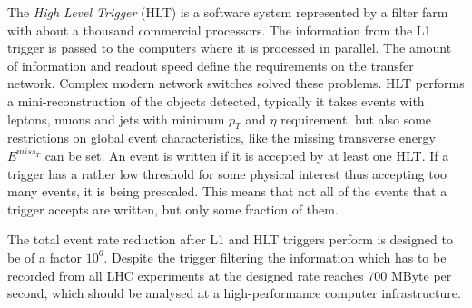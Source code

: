 The \textit{High Level Trigger} (HLT) is a software system represented by a filter farm with about a thousand commercial processors. The information
from the L1 trigger is passed to the computers where it is processed in parallel. The amount of information and readout speed define the requirements
on the transfer network. Complex modern network switches solved these problems. HLT performs a mini-reconstruction of the objects detected,
typically it takes events with leptons, muons and jets with minimum $p_{T}$ and $\eta$ requirement, but also some restrictions on global
event characteristics, like the missing transverse energy $E^{miss_{T}}$ can be set. An event is written if it is accepted by at least one HLT.
If a trigger has a rather low threshold for some physical interest thus accepting too many events, it is being prescaled. This means that not 
all of the events that a trigger accepts are written, but only some fraction of them.

The total event rate reduction after L1 and HLT triggers perform is designed to be of a factor $10^{6}$. Despite the trigger filtering
the information which has to be recorded from all LHC experiments at the designed rate reaches 700 MByte per second, which should be analysed 
at a high-performance computer infrastructure\cite{CMScompTDR}.
% 
